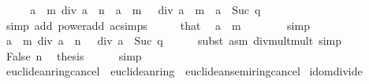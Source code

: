 \begin{isabellebody}
\ \ \isamarkupfalse%
\ \isamarkupfalse%
\ {\isacartoucheopen}a\ {\isacharcircum}{\kern0pt}\ m\ div\ a\ {\isacharcircum}{\kern0pt}\ n\ {\isacharequal}{\kern0pt}\ {\isacharparenleft}{\kern0pt}a\ {\isacharcircum}{\kern0pt}\ m\ {\isacharasterisk}{\kern0pt}\ {}{\isacharparenright}{\kern0pt}\ div\ {\isacharparenleft}{\kern0pt}a\ {\isacharcircum}{\kern0pt}\ m\ {\isacharasterisk}{\kern0pt}\ a\ {\isacharcircum}{\kern0pt}\ Suc\ q{\isacharparenright}{\kern0pt}{\isacartoucheclose}\isanewline
\ \ \ \ \isamarkupfalse%
\ {\isacharparenleft}{\kern0pt}simp\ add{\isacharcolon}{\kern0pt}\ power{\isacharunderscore}{\kern0pt}add\ ac{\isacharunderscore}{\kern0pt}simps{\isacharparenright}{\kern0pt}\isanewline
\ \ \isamarkupfalse%
\ \isamarkupfalse%
\ that\ \isamarkupfalse%
\ {\isacartoucheopen}a\ {\isacharcircum}{\kern0pt}\ m\ {\isasymnoteq}\ {}{\isacartoucheclose}\isanewline
\ \ \ \ \isamarkupfalse%
\ simp\isanewline
\ \ \isamarkupfalse%
\ \isamarkupfalse%
\ {\isacartoucheopen}a\ {\isacharcircum}{\kern0pt}\ m\ div\ a\ {\isacharcircum}{\kern0pt}\ n\ {\isacharequal}{\kern0pt}\ {}\ div\ a\ {\isacharcircum}{\kern0pt}\ Suc\ q{\isacartoucheclose}\isanewline
\ \ \ \ \isamarkupfalse%
\ {\isacharparenleft}{\kern0pt}subst\ {\isacharparenleft}{\kern0pt}asm{\isacharparenright}{\kern0pt}\ div{\isacharunderscore}{\kern0pt}mult{\isacharunderscore}{\kern0pt}mult{}{\isacharparenright}{\kern0pt}\ simp\isanewline
\ \ \isamarkupfalse%
\ False\ n\ \isamarkupfalse%
\ {\isacharquery}{\kern0pt}thesis\isanewline
\ \ \ \ \isamarkupfalse%
\ simp\isanewline
{}\isamarkupfalse%
%
\endisatagproof
{\isafoldproof}%
%
\isadelimproof
\isanewline
%
\endisadelimproof
\isanewline
{}\isamarkupfalse%
\isanewline
\isanewline
\isanewline
{}\isamarkupfalse%
\ euclidean{\isacharunderscore}{\kern0pt}ring{\isacharunderscore}{\kern0pt}cancel\ {\isacharequal}{\kern0pt}\ euclidean{\isacharunderscore}{\kern0pt}ring\ {\isacharplus}{\kern0pt}\ euclidean{\isacharunderscore}{\kern0pt}semiring{\isacharunderscore}{\kern0pt}cancel\isanewline
{}\isanewline
\isanewline
{}\isamarkupfalse%
\ idom{\isacharunderscore}{\kern0pt}divide%
\isadelimproof
\ %
\endisadelimproof
%
\isatagproof
\isacommand{{\isachardot}{\kern0pt}{\isachardot}{\kern0pt}}\isamarkupfalse%
%
\endisatagproof
{\isafoldproof}%

\end{isabellebody}
